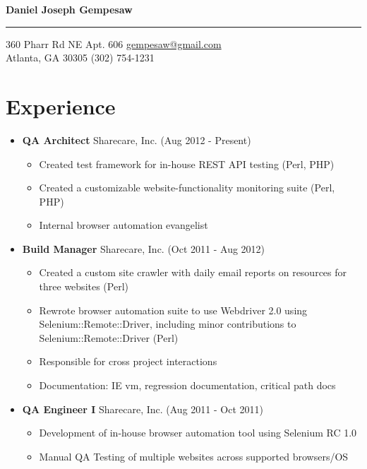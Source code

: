 \documentclass[10pt]{article}
\newenvironment{myitem}{
  \begin{itemize}
    \setlength{\itemsep}{1pt}
    \setlength{\parskip}{0pt}
    \setlength{\parsep}{0pt}
}{\end{itemize}}
\newcommand{\headerrow}[3] {
  \item \textbf{#1} #2 \hfill (#3)
}
\newcommand{\myauthor}[1] {
  \begin{center}
    \Large
    \textbf{#1}
  \end{center}
  \hrule
  \vspace{0.2 cm}
  \normalsize}
\newcommand{\contact}[4] {
  #1 \hfill \href{mailto:#3}{#3}\\
  #2 \hfill #4\\
\vspace{-.60 cm}
}
\begin{document}
\myauthor{Daniel Joseph Gempesaw}
\contact{360 Pharr Rd NE Apt. 606}
        {Atlanta, GA 30305}
        {gempesaw@gmail.com}
        {(302) 754-1231}

\section{Experience}

\begin{itemize}

\headerrow {QA Architect}{Sharecare, Inc.}{Aug 2012 - Present}
  \begin{myitem}
  \item Created test framework for in-house REST API testing (Perl, PHP)
  \item Created a customizable website-functionality monitoring suite (Perl, PHP)
  \item Internal browser automation evangelist
  \end{myitem}

\headerrow {Build Manager}{Sharecare, Inc.}{Oct 2011 - Aug 2012}
  \begin{myitem}
  \item Created a custom site crawler with daily email reports on resources for three websites (Perl)
  \item Rewrote browser automation suite to use Webdriver 2.0 using Selenium::Remote::Driver,
    including minor contributions to Selenium::Remote::Driver (Perl)
  \item Responsible for cross project interactions
  \item Documentation: IE vm, regression documentation, critical path docs
  \end{myitem}

\headerrow {QA Engineer I}{Sharecare, Inc.}{Aug 2011 - Oct 2011}
  \begin{myitem}
  \item Development of in-house browser automation tool using Selenium RC 1.0
  \item Manual QA Testing of multiple websites across supported browsers/OS
  \end{myitem}


\end{itemize}
\end{document}

